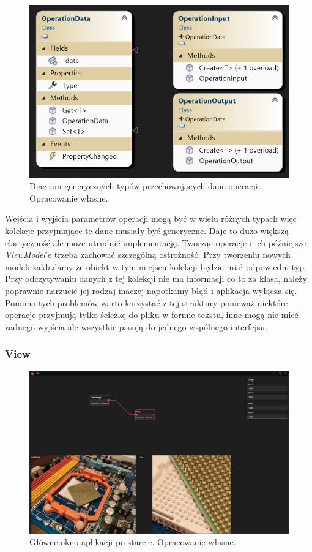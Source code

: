 \begin{figure}[H]
    \centering
    \includegraphics[width=0.6\linewidth]{images/Picture12.png}
    \caption{Diagram generycznych typów przechowujących dane operacji. Opracowanie własne.}
    \label{fig:input}
\end{figure}

Wejścia i wyjścia parametrów operacji mogą być w wielu różnych typach więc kolekcje przyjmujące te dane musiały być generyczne. 
Daje to dużo większą elastyczność ale może utrudnić implementację. 
Tworząc operacje i ich późniejsze \textit{ViewModel}'e trzeba zachować szczególną ostrożność. 
Przy tworzeniu nowych modeli zakładamy że obiekt w tym miejscu kolekcji będzie miał odpowiedni typ. 
Przy odczytywaniu danych z tej kolekcji nie ma informacji co to za klasa, należy poprawnie narzucić jej rodzaj inaczej napotkamy błąd i aplikacja wyłącza się.
Pomimo tych problemów warto korzystać z tej struktury ponieważ niektóre operacje przyjmują tylko ścieżkę do pliku w formie tekstu, inne mogą nie mieć żadnego wyjścia ale wszystkie pasują do jednego wspólnego interfejsu.

\subsubsection{View}

\begin{figure}[H]
    \centering
    \includegraphics[width=1\linewidth]{images/Picture13.png}
    \caption{Główne okno aplikacji po starcie. Opracowanie własne.}
    \label{fig:window}
\end{figure}

